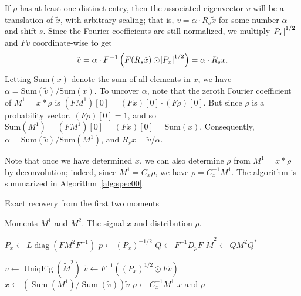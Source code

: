 \documentclass{IEEEtran}
\numberwithin{equation}{section}
\numberwithin{figure}{section}
\theoremstyle{plain}
\theoremstyle{definition}
\theoremstyle{remark}
\theoremstyle{plain}
\theoremstyle{remark}
\theoremstyle{plain}
\theoremstyle{plain}
\theoremstyle{remark}
\newcommand{\F}{F}
\DeclareMathOperator*{\diag}{diag}
\begin{document}
If $\rho$ has at least one distinct entry, then the associated eigenvector $v$ will be a translation of $\tilde{x}$, with arbitrary scaling; that is, $v = \alpha \cdot R_s \tilde{x}$ for some number $\alpha$ and shift $s$. Since the Fourier coefficients are still normalized, we multiply $\abs{P_x}^{1/2}$ and $\F v$ coordinate-wise to get
\[ \tilde{v} = \alpha \cdot \F^{-1} \left( \F(R_s \tilde{x}) \odot \abs{P_x}^{1/2} \right) 
= \alpha \cdot R_s x . \]
Letting $\text{Sum}(x)$ denote the sum of all elements in $x$, we have $\alpha = \text{Sum}( \tilde{v} ) / \text{Sum}(x)$. To uncover $\alpha$, note that the zeroth Fourier coefficient of $M^1 = x \ast \rho$ is $(F M^1)[0] = (Fx)[0] \cdot (F\rho)[0]$. But since $\rho$ is a probability vector, $(F \rho)[0] = 1$, and so $\text{Sum}(M^1) = (F M^1)[0] = (Fx)[0] = \text{Sum}(x)$. Consequently, $\alpha = \text{Sum}(\tilde{v} ) / \text{Sum}(M^1)$, and $R_s x = \tilde{v} / \alpha$.

Note that once we have determined $x$, we can also determine $\rho$ from $M^1 = x \ast \rho$ by deconvolution; indeed, since $M^1 = C_x \rho$, we have $\rho = C_x^{-1} M^1$. The algorithm is summarized in Algorithm~\ref{alg:spec00}.

\begin{algorithm}[ht]
    \caption{Exact recovery from the first two moments}
    \label{alg:spec00}
    \begin{algorithmic}[1]
        \REQUIRE Moments $M^1$ and $M^2$.
        \ENSURE The signal $x$ and distribution $\rho$.
        
         \setcounter{ALC@line}{0}  \renewcommand{\theALC@line}{1.\arabic{ALC@line}}
        
        \STATE $P_x  \gets  L\diag(F M^2 F^{-1}) $ 
        \STATE $p  \gets  (P_x)^{-1/2} $ 
        \STATE $Q \gets \F^{-1} D_{p}\F$ 
        \STATE $\widetilde{M}^2 \gets Q M^2 Q^\ast$

         \setcounter{ALC@line}{0}  \renewcommand{\theALC@line}{2.\arabic{ALC@line}}

        \STATE $v \gets \operatorname{UniqEig}(\widetilde{M}^2)$ 
        \STATE $\tilde{v} \gets \F^{-1}\left(  (P_x)^{1/2} \odot \F v  \right)$ 
        \STATE $x \gets \left(  \operatorname{Sum}(M^1)/  \operatorname{Sum}(\tilde{v}) \right) \tilde{v}$
        \STATE $\rho \gets C_{x}^{-1}M^1 $
        \RETURN $x$ and $\rho$
    \end{algorithmic}
\end{algorithm}
\end{document}
